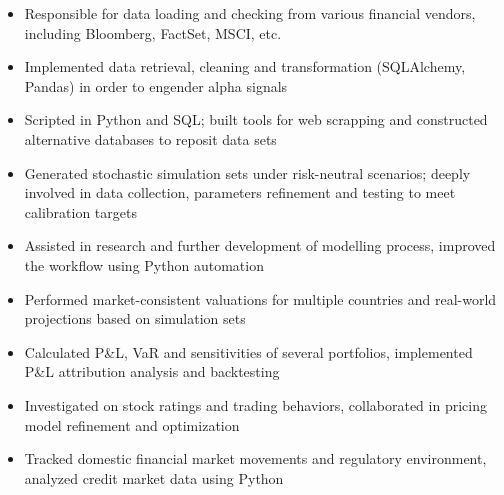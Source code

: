 \documentclass[classic]{resume}
\begin{document}
    \begin{itemize}
        \item Responsible for data loading and checking from various financial vendors, including Bloomberg, FactSet, MSCI, etc.
        \item Implemented data retrieval, cleaning and transformation (SQLAlchemy, Pandas) in order to engender alpha signals
        \item Scripted in Python and SQL; built tools for web scrapping and constructed alternative databases to reposit data sets
    \end{itemize}
    \begin{itemize}
        \item Generated stochastic simulation sets under risk-neutral scenarios; deeply involved in data collection, parameters refinement and testing to meet calibration targets
        \item Assisted in research and further development of modelling process, improved the workflow using Python automation
        \item Performed market-consistent valuations for multiple countries and real-world projections based on simulation sets
    \end{itemize}
    \begin{itemize}
        \item Calculated P\&L, VaR and sensitivities of several portfolios, implemented P\&L attribution analysis and backtesting
        \item Investigated on stock ratings and trading behaviors, collaborated in pricing model refinement and optimization
        \item Tracked domestic financial market movements and regulatory environment, analyzed credit market data using Python
    \end{itemize}
\end{document}

